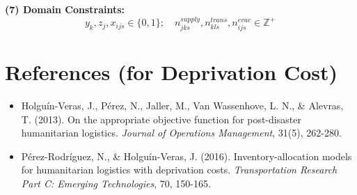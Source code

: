 \textbf{(7) Domain Constraints:}
\begin{equation}
y_k, z_j, x_{ijs} \in \{0,1\}; \quad n_{jks}^{supply}, n_{kls}^{trans}, n_{ijs}^{evac} \in \mathbb{Z}^+
\end{equation}

\section{References (for Deprivation Cost)}
\begin{itemize}
    \item Holguín-Veras, J., Pérez, N., Jaller, M., Van Wassenhove, L. N., \& Alevras, T. (2013). On the appropriate objective function for post-disaster humanitarian logistics. \textit{Journal of Operations Management}, 31(5), 262-280.
    \item Pérez-Rodríguez, N., \& Holguín-Veras, J. (2016). Inventory-allocation models for humanitarian logistics with deprivation costs. \textit{Transportation Research Part C: Emerging Technologies}, 70, 150-165.
\end{itemize}

